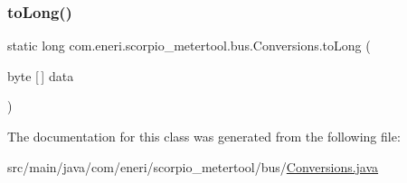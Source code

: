 \subsubsection{\texorpdfstring{to\+Long()}{toLong()}}
{\footnotesize\ttfamily static long com.\+eneri.\+scorpio\+\_\+metertool.\+bus.\+Conversions.\+to\+Long (\begin{DoxyParamCaption}\item[{byte \mbox{[}$\,$\mbox{]}}]{data }\end{DoxyParamCaption})\hspace{0.3cm}{\ttfamily [static]}}



The documentation for this class was generated from the following file\+:\begin{DoxyCompactItemize}
\item 
src/main/java/com/eneri/scorpio\+\_\+metertool/bus/\hyperlink{_conversions_8java}{Conversions.\+java}\end{DoxyCompactItemize}
